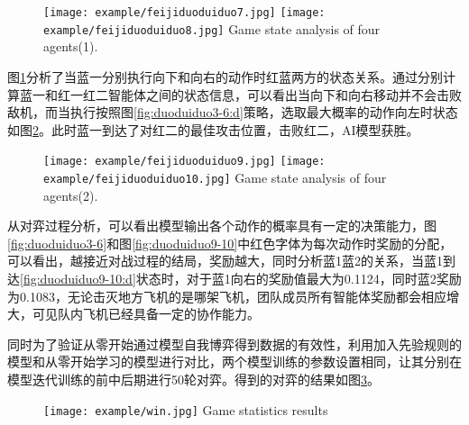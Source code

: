 \begin{figure}[hpbt]
	\centering
	{\texttt{[image: example/feijiduoduiduo7.jpg]}}
	\hspace{0.5em}
	{\texttt{[image: example/feijiduoduiduo8.jpg]}}
	{Game state analysis of four agents(1).}
	\label{fig2:duoduiduo}
\end{figure}

图\ref{fig2:duoduiduo}分析了当蓝一分别执行向下和向右的动作时红蓝两方的状态关系。通过分别计算蓝一和红一红二智能体之间的状态信息，可以看出当向下和向右移动并不会击败敌机，而当执行按照图\ref{fig:duoduiduo3-6:d}策略，选取最大概率的动作向左时状态如图\ref{fig3:duoduiduo}。此时蓝一到达了对红二的最佳攻击位置，击败红二，AI模型获胜。

\begin{figure}[hpbt]
	\centering
	{\texttt{[image: example/feijiduoduiduo9.jpg]}}
	\hspace{0.5em}
	{\texttt{[image: example/feijiduoduiduo10.jpg]}}
	{Game state analysis of four agents(2).}
	\label{fig3:duoduiduo}
\end{figure}

从对弈过程分析，可以看出模型输出各个动作的概率具有一定的决策能力，图\ref{fig:duoduiduo3-6}和图\ref{fig:duoduiduo9-10}中红色字体为每次动作时奖励的分配，可以看出，越接近对战过程的结局，奖励越大，同时分析蓝1蓝2的关系，当蓝1到达\ref{fig:duoduiduo9-10:d}状态时，对于蓝1向右的奖励值最大为0.1124，同时蓝2奖励为0.1083，无论击灭地方飞机的是哪架飞机，团队成员所有智能体奖励都会相应增大，可见队内飞机已经具备一定的协作能力。

同时为了验证从零开始通过模型自我博弈得到数据的有效性，利用加入先验规则的模型和从零开始学习的模型进行对比，两个模型训练的参数设置相同，让其分别在模型迭代训练的前中后期进行50轮对弈。得到的对弈的结果如图\ref{fig:win}。

\begin{figure}[hbtp]
	\centering
	\texttt{[image: example/win.jpg]}
	{Game statistics results}
	\label{fig:win}
\end{figure}

